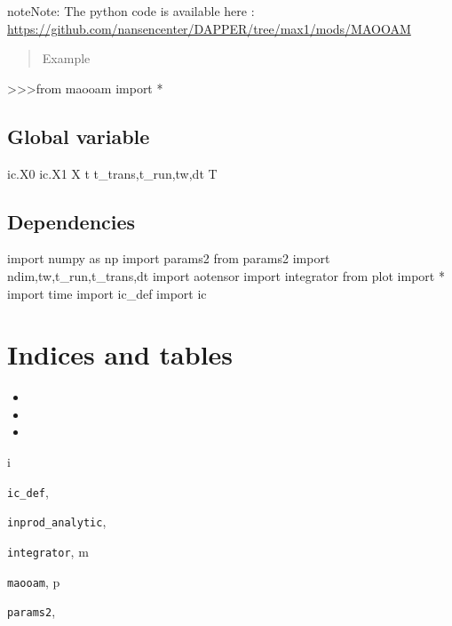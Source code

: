 \documentclass[letterpaper,10pt,english]{sphinxmanual}
\begin{document}
\begin{notice}{note}{Note:}
The python code is available here : \url{https://github.com/nansencenter/DAPPER/tree/max1/mods/MAOOAM}
\end{notice}
\begin{quote}\begin{description}
\item[{Example}] \leavevmode
\end{description}\end{quote}

\textgreater{}\textgreater{}\textgreater{}from maooam import *


\section{Global variable}
\label{rstfiles/maooam:global-variable}
ic.X0
ic.X1
X
t
t\_trans,t\_run,tw,dt
T


\section{Dependencies}
\label{rstfiles/maooam:dependencies}
import numpy as np
import params2
from params2 import ndim,tw,t\_run,t\_trans,dt
import aotensor
import integrator
from plot import *
import time
import ic\_def
import ic


\chapter{Indices and tables}
\label{index:indices-and-tables}\begin{itemize}
\item {} 

\item {} 

\item {} 

\end{itemize}


\renewcommand{\indexname}{Python Module Index}
\begin{theindex}
\def\bigletter#1{{\Large\sffamily#1}\nopagebreak\vspace{1mm}}
\bigletter{i}
\item {\texttt{ic\_def}}, \pageref{rstfiles/ic_def:module-ic_def}
\item {\texttt{inprod\_analytic}}, \pageref{rstfiles/inprod_analytic:module-inprod_analytic}
\item {\texttt{integrator}}, \pageref{rstfiles/integrator:module-integrator}
\indexspace
\bigletter{m}
\item {\texttt{maooam}}, \pageref{rstfiles/maooam:module-maooam}
\indexspace
\bigletter{p}
\item {\texttt{params2}}, \pageref{rstfiles/params2:module-params2}
\end{theindex}

\renewcommand{\indexname}{Index}
\printindex
\end{document}
